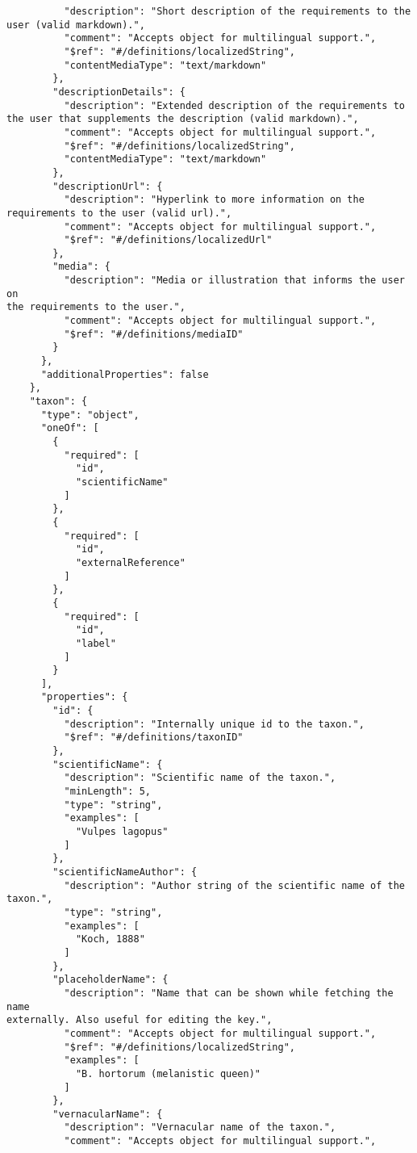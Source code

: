 \documentclass[10pt,letterpaper]{article}
\begin{document}
\begin{verbatim}
          "description": "Short description of the requirements to the
user (valid markdown).",
          "comment": "Accepts object for multilingual support.",
          "$ref": "#/definitions/localizedString",
          "contentMediaType": "text/markdown"
        },
        "descriptionDetails": {
          "description": "Extended description of the requirements to
the user that supplements the description (valid markdown).",
          "comment": "Accepts object for multilingual support.",
          "$ref": "#/definitions/localizedString",
          "contentMediaType": "text/markdown"
        },
        "descriptionUrl": {
          "description": "Hyperlink to more information on the
requirements to the user (valid url).",
          "comment": "Accepts object for multilingual support.",
          "$ref": "#/definitions/localizedUrl"
        },
        "media": {
          "description": "Media or illustration that informs the user on
the requirements to the user.",
          "comment": "Accepts object for multilingual support.",
          "$ref": "#/definitions/mediaID"
        }
      },
      "additionalProperties": false
    },
    "taxon": {
      "type": "object",
      "oneOf": [
        {
          "required": [
            "id",
            "scientificName"
          ]
        },
        {
          "required": [
            "id",
            "externalReference"
          ]
        },
        {
          "required": [
            "id",
            "label"
          ]
        }
      ],
      "properties": {
        "id": {
          "description": "Internally unique id to the taxon.",
          "$ref": "#/definitions/taxonID"
        },
        "scientificName": {
          "description": "Scientific name of the taxon.",
          "minLength": 5,
          "type": "string",
          "examples": [
            "Vulpes lagopus"
          ]
        },
        "scientificNameAuthor": {
          "description": "Author string of the scientific name of the
taxon.",
          "type": "string",
          "examples": [
            "Koch, 1888"
          ]
        },
        "placeholderName": {
          "description": "Name that can be shown while fetching the name
externally. Also useful for editing the key.",
          "comment": "Accepts object for multilingual support.",
          "$ref": "#/definitions/localizedString",
          "examples": [
            "B. hortorum (melanistic queen)"
          ]
        },
        "vernacularName": {
          "description": "Vernacular name of the taxon.",
          "comment": "Accepts object for multilingual support.",

\end{verbatim}
\end{document}
